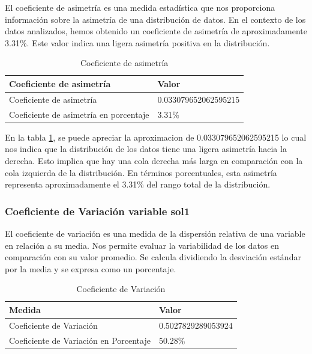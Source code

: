 El coeficiente de asimetría es una medida estadística que nos proporciona información sobre la asimetría de una distribución de datos. En el contexto de los datos analizados, hemos obtenido un coeficiente de asimetría de aproximadamente 3.31\%. Este valor indica una ligera asimetría positiva en la distribución.

\begin{table}[H]
    \centering
    \caption{Coeficiente de asimetría}
    \begin{tabular}{ll}
        \hline
        \textbf{Coeficiente de asimetría}      & \textbf{Valor}       \\
        \hline
        Coeficiente de asimetría               & 0.033079652062595215 \\
        Coeficiente de asimetría en porcentaje & 3.31\%               \\
        \hline
    \end{tabular}%
    \label{tab:skewness}%
\end{table}%

En la tabla \ref{tab:skewness}, se puede apreciar la aproximacion de 0.033079652062595215 lo cual nos indica que la distribución de los datos tiene una ligera asimetría hacia la derecha. Esto implica que hay una cola derecha más larga en comparación con la cola izquierda de la distribución. En términos porcentuales, esta asimetría representa aproximadamente el 3.31\% del rango total de la distribución.

\subsubsection{Coeficiente de Variación variable sol1}

El coeficiente de variación es una medida de la dispersión relativa de una variable en relación a su media. Nos permite evaluar la variabilidad de los datos en comparación con su valor promedio. Se calcula dividiendo la desviación estándar por la media y se expresa como un porcentaje.

\begin{table}[H]
    \centering
    \caption{Coeficiente de Variación}
    \begin{tabular}{ll}
        \hline
        \textbf{Medida}                        & \textbf{Valor}     \\
        \hline
        Coeficiente de Variación               & 0.5027829289053924 \\
        \hline
        Coeficiente de Variación en Porcentaje & 50.28\%            \\
        \hline
    \end{tabular}%
    \label{tab:coef_variacion}%
\end{table}%

